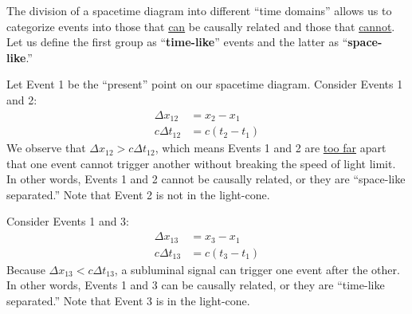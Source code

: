 \documentclass[a4paper,11pt]{article}
\numberwithin{equation}{section}
\begin{document}
 \noindent The division of a spacetime diagram into different ``time domains'' allows us to categorize events into those that \underline{can} be causally related and those that \underline{cannot}. Let us define the first group as ``\textbf{time-like}'' events and the latter as ``\textbf{space-like}.''   
 
 \noindent Let Event 1 be the ``present'' point on our spacetime diagram. Consider Events 1 and 2:
 \begin{equation}
 \begin{split}
 \Delta x_{12}&=x_2-x_1 \\
 c\Delta t_{12}&=c(t_2-t_1)
 \end{split}
 \end{equation}
 \noindent We observe that $\Delta x_{12} > c\Delta t_{12}$, which means Events 1 and 2 are \underline{too far} apart that one event cannot trigger another without breaking the speed of light limit. In other words, Events 1 and 2 cannot be causally related, or they are ``space-like separated.'' Note that Event 2 is not in the light-cone.
 
 \noindent Consider Events 1 and 3:
 \begin{equation}
 \begin{split}
 \Delta x_{13}&=x_3-x_1\\
 c\Delta t_{13}&=c(t_3-t_1)
 \end{split}
 \end{equation} 
 \noindent Because $\Delta x_{13} < c\Delta t_{13}$, a subluminal signal can trigger one event after the other. In other words, Events 1 and 3 can be causally related, or they are ``time-like separated.'' Note that Event 3 is in the light-cone.
 
 
\end{document}
